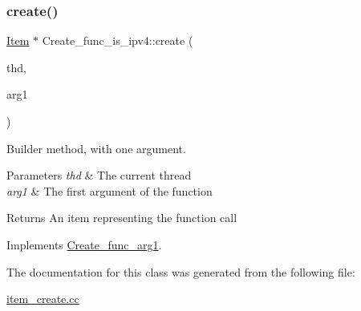 \subsubsection{\texorpdfstring{create()}{create()}}
{\footnotesize\ttfamily \mbox{\hyperlink{classItem}{Item}} $\ast$ Create\+\_\+func\+\_\+is\+\_\+ipv4\+::create (\begin{DoxyParamCaption}\item[{T\+HD $\ast$}]{thd,  }\item[{\mbox{\hyperlink{classItem}{Item}} $\ast$}]{arg1 }\end{DoxyParamCaption})\hspace{0.3cm}{\ttfamily [virtual]}}

Builder method, with one argument. 
\begin{DoxyParams}{Parameters}
{\em thd} & The current thread \\
\hline
{\em arg1} & The first argument of the function \\
\hline
\end{DoxyParams}
\begin{DoxyReturn}{Returns}
An item representing the function call 
\end{DoxyReturn}


Implements \mbox{\hyperlink{classCreate__func__arg1_a3e9a98f755cd82c3e762e334c955a8c9}{Create\+\_\+func\+\_\+arg1}}.



The documentation for this class was generated from the following file\+:\begin{DoxyCompactItemize}
\item 
\mbox{\hyperlink{item__create_8cc}{item\+\_\+create.\+cc}}\end{DoxyCompactItemize}
